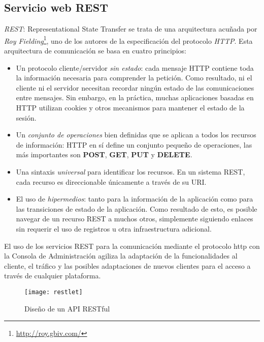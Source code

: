 
\subsection{Servicio web REST}
\label{sub:rest-ws}

\par \emph{REST}: Representational State Transfer se trata de una arquitectura acuñada por \emph{Roy Fielding}\footnote{\url{http://roy.gbiv.com/}}, uno de los autores de la especificación del protocolo \emph{HTTP}. Esta arquitectura de comunicación se basa en cuatro principios:

\begin{itemize}
	\item Un protocolo cliente/servidor \emph{sin estado}: cada mensaje HTTP contiene toda la información necesaria para comprender la petición. Como resultado, ni el cliente ni el servidor necesitan recordar ningún estado de las comunicaciones entre mensajes. Sin embargo, en la práctica, muchas aplicaciones basadas en HTTP utilizan cookies y otros mecanismos para mantener el estado de la sesión.

	\item Un \emph{conjunto de operaciones} bien definidas que se aplican a todos los recursos de información: HTTP en sí define un conjunto pequeño de operaciones, las más importantes son \textbf{POST}, \textbf{GET}, \textbf{PUT} y \textbf{DELETE}.

	\item Una sintaxis \emph{universal} para identificar los recursos. En un sistema REST, cada recurso es direccionable únicamente a través de su URI.

	\item El uso de \emph{hipermedios}: tanto para la información de la aplicación como para las transiciones de estado de la aplicación. Como resultado de esto, es posible navegar de un recurso REST a muchos otros, simplemente siguiendo enlaces sin requerir el uso de registros u otra infraestructura adicional.
\end{itemize}

\par El uso de los servicios REST para la comunicación mediante el protocolo http con la Consola de Administración agiliza la adaptación de la funcionalidades al cliente, el tráfico y las posibles adaptaciones de nuevos clientes para el acceso a través de cualquier plataforma.

\begin{figure}[H]
    \centering
    \texttt{[image: restlet]}
    \caption{Diseño de un API RESTful}
    \label{fig:restful-api}
\end{figure}

